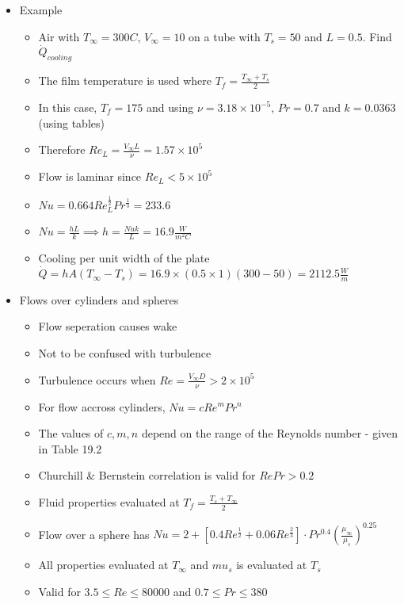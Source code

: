 \documentclass[12pt]{article}
\begin{document}
\begin{itemize}
\begin{itemize}
    \end{itemize}
    \item Example \begin{itemize}
        \item Air with $T_{\infty} = 300 C$, $V_{\infty} = 10$ on a tube with $T_s = 50$ and $L = 0.5$. Find $\dot{Q}_{cooling}$
        \item The film temperature is used where $T_f = \frac{T_{\infty}+T_s}{2}$
        \item In this case, $T_f = 175$ and using $\nu = 3.18 \times 10^{-5}$, $Pr = 0.7$ and $k = 0.0363$ (using tables)
        \item Therefore $Re_L = \frac{V_{\infty}L}{\nu} = 1.57 \times 10^5$
        \item Flow is laminar since $Re_L < 5 \times 10^5$
        \item $Nu = 0.664 Re_L ^{\frac{1}{2}} Pr^{\frac{1}{3}} = 233.6$
        \item $Nu = \frac{hL}{k} \implies h = \frac{Nu k}{L} = 16.9 \frac{W}{m^2 C}$
        \item Cooling per unit width of the plate $\dot{Q} = hA(T_{\infty} - T_s) = 16.9 \times (0.5 \times 1) (300 - 50) = 2112.5 \frac{W}{m}$
    \end{itemize}
    \item Flows over cylinders and spheres \begin{itemize}
        \item Flow seperation causes wake
        \item Not to be confused with turbulence 
        \item Turbulence occurs when $Re = \frac{V_{\infty} D}{\nu} > 2 \times 10^5$
        \item For flow accross cylinders, $Nu = c Re^m Pr^n$
        \item The values of $c, m, n$ depend on the range of the Reynolds number - given in Table 19.2
        \item Churchill \& Bernstein correlation is valid for $Re Pr > 0.2$
        \item Fluid properties evaluated at $T_f = \frac{T_s + T_{\infty}}{2}$
        \item Flow over a sphere has $Nu = 2 + [0.4 Re^{\frac{1}{2}} + 0.06 Re^{\frac{2}{3}}] \cdot Pr^{0.4} \left(\frac{\mu_{\infty}}{\mu_s} \right) ^{0.25}$
        \item All properties evaluated at $T_{\infty}$ and $mu_s$ is evaluated at $T_s$
        \item Valid for $3.5 \leq Re \leq 80000$ and $0.7 \leq Pr \leq 380$
    \end{itemize}
\end{itemize}
\end{document}

